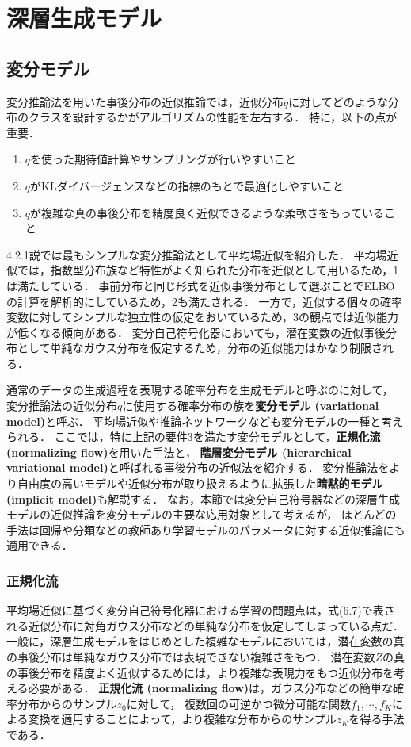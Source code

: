 \documentclass[11pt,a4paper]{jsarticle}
\numberwithin{equation}{section}
\begin{document}
	
\setcounter{section}{5}
\section{深層生成モデル}

\setcounter{subsection}{1}
\setcounter{equation}{24}
\subsection{変分モデル}
変分推論法を用いた事後分布の近似推論では，近似分布$q$に対してどのような分布のクラスを設計するかがアルゴリズムの性能を左右する．
特に，以下の点が重要．
\begin{enumerate}
\item $q$を使った期待値計算やサンプリングが行いやすいこと
\item $q$がKLダイバージェンスなどの指標のもとで最適化しやすいこと
\item $q$が複雑な真の事後分布を精度良く近似できるような柔軟さをもっていること
\end{enumerate}

4.2.1説では最もシンプルな変分推論法として平均場近似を紹介した．
平均場近似では，指数型分布族など特性がよく知られた分布を近似として用いるため，1は満たしている．
事前分布と同じ形式を近似事後分布として選ぶことでELBOの計算を解析的にしているため，2も満たされる．
一方で，近似する個々の確率変数に対してシンプルな独立性の仮定をおいているため，3の観点では近似能力が低くなる傾向がある．
変分自己符号化器においても，潜在変数の近似事後分布として単純なガウス分布を仮定するため，分布の近似能力はかなり制限される．

通常のデータの生成過程を表現する確率分布を生成モデルと呼ぶのに対して，
変分推論法の近似分布$q$に使用する確率分布の族を\textbf{変分モデル (variational model)}と呼ぶ．
平均場近似や推論ネットワークなども変分モデルの一種と考えられる．
ここでは，特に上記の要件3を満たす変分モデルとして，\textbf{正規化流 (normalizing flow)}を用いた手法と，
\textbf{階層変分モデル (hierarchical variational model)}と呼ばれる事後分布の近似法を紹介する．
変分推論法をより自由度の高いモデルや近似分布が取り扱えるように拡張した\textbf{暗黙的モデル (implicit model)}も解説する．
なお，本節では変分自己符号器などの深層生成モデルの近似推論を変分モデルの主要な応用対象として考えるが，
ほとんどの手法は回帰や分類などの教師あり学習モデルのパラメータに対する近似推論にも適用できる．

\subsubsection{正規化流}
平均場近似に基づく変分自己符号化器における学習の問題点は，式(6.7)で表される近似分布に対角ガウス分布などの単純な分布を仮定してしまっている点だ．
一般に，深層生成モデルをはじめとした複雑なモデルにおいては，潜在変数の真の事後分布は単純なガウス分布では表現できない複雑さをもつ．
潜在変数$Z$の真の事後分布を精度よく近似するためには，より複雑な表現力をもつ近似分布を考える必要がある．
\textbf{正規化流 (normalizing flow)}は，ガウス分布などの簡単な確率分布からのサンプル$z_0$に対して，
複数回の可逆かつ微分可能な関数$f_1, \cdots, f_K$による変換を適用することによって，より複雑な分布からのサンプル$z_K$を得る手法である．
\end{document}
